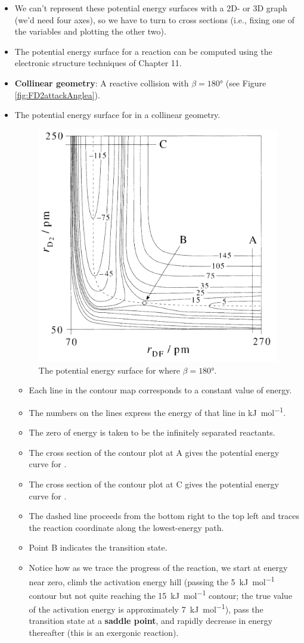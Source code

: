 \documentclass[../notes.tex]{subfiles}
\begin{document}
\begin{itemize}
    \item We can't represent these potential energy surfaces with a 2D- or 3D graph (we'd need four axes), so we have to turn to cross sections (i.e., fixing one of the variables and plotting the other two).
    \item The potential energy surface for a reaction can be computed using the electronic structure techniques of Chapter 11.
    \item \textbf{Collinear geometry}: A reactive collision with $\beta=\ang{180}$ (see Figure \ref{fig:FD2attackAnglea}).
    \item The potential energy surface for  in a collinear geometry.
    \begin{figure}[H]
        \centering
        \includegraphics[width=0.4\linewidth]{../ExtFiles/FD2PEScollinear.png}
        \caption{The potential energy surface for  where $\beta=\ang{180}$.}
        \label{fig:FD2PEScollinear}
    \end{figure}
    \begin{itemize}
        \item Each line in the contour map corresponds to a constant value of energy.
        \item The numbers on the lines express the energy of that line in \si{\kilo\joule\per\mole}.
        \item The zero of energy is taken to be the infinitely separated reactants.
        \item The cross section of the contour plot at A gives the potential energy curve for .
        \item The cross section of the contour plot at C gives the potential energy curve for .
        \item The dashed line proceeds from the bottom right to the top left and traces the reaction coordinate along the lowest-energy path.
        \item Point B indicates the transition state.
        \item Notice how as we trace the progress of the reaction, we start at energy near zero, climb the activation energy hill (passing the \SI{5}{\kilo\joule\per\mole} contour but not quite reaching the \SI{15}{\kilo\joule\per\mole} contour; the true value of the activation energy is approximately \SI{7}{\kilo\joule\per\mole}), pass the transition state at a \textbf{saddle point}, and rapidly decrease in energy thereafter (this is an exergonic reaction).

\end{itemize}
\end{itemize}
\end{document}
